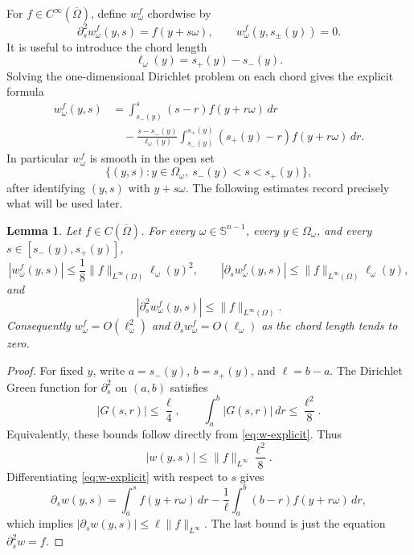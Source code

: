 \documentclass[11pt]{article}
\numberwithin{equation}{section}
\newtheorem{lemma}[theorem]{Lemma}
\newcommand{\Sn}{\mathbb S^{n-1}}
\newcommand{\Om}{\Omega}
\begin{document}
For \(f\in C^\infty(\overline\Om)\), define \(w_\omega^f\) chordwise by
\begin{equation}\label{eq:w-correction}
    \partial_s^2 w_\omega^f(y,s)
    =
    f(y+s\omega),
    \qquad
    w_\omega^f(y,s_\pm(y))=0 .
\end{equation}
It is useful to introduce the chord length
\begin{equation}\label{eq:chord-length}
    \ell_\omega(y)=s_+(y)-s_-(y).
\end{equation}
Solving the one-dimensional Dirichlet problem on each chord gives the explicit formula
\begin{equation}\label{eq:w-explicit}
\begin{aligned}
    w_\omega^f(y,s)
    &=
    \int_{s_-(y)}^s (s-r) f(y+r\omega)\,dr \\
    &\quad
    -
    \frac{s-s_-(y)}{\ell_\omega(y)}
    \int_{s_-(y)}^{s_+(y)}
        (s_+(y)-r) f(y+r\omega)\,dr .
\end{aligned}
\end{equation}
In particular \(w_\omega^f\) is smooth in the open set
\[
    \{(y,s):y\in\Omega_\omega,\ s_-(y)<s<s_+(y)\},
\]
after identifying \((y,s)\) with \(y+s\omega\).  The following estimates record precisely what will be used later.

\begin{lemma}\label{lem:chordwise-C0-bounds}
Let \(f\in C(\overline\Om)\).  For every \(\omega\in\Sn\), every \(y\in\Omega_\omega\), and every \(s\in[s_-(y),s_+(y)]\),
\begin{equation}\label{eq:chordwise-basic-bounds}
    |w_\omega^f(y,s)|
    \le
    \frac18 \|f\|_{L^\infty(\Om)}\ell_\omega(y)^2,
    \qquad
    |\partial_s w_\omega^f(y,s)|
    \le
    \|f\|_{L^\infty(\Om)}\ell_\omega(y),
\end{equation}
and
\begin{equation}\label{eq:chordwise-second-s-bound}
    |\partial_s^2w_\omega^f(y,s)|
    \le
    \|f\|_{L^\infty(\Om)}.
\end{equation}
Consequently \(w_\omega^f=O(\ell_\omega^2)\) and \(\partial_s w_\omega^f=O(\ell_\omega)\) as the chord length tends to zero.
\end{lemma}

\begin{proof}
For fixed \(y\), write \(a=s_-(y)\), \(b=s_+(y)\), and \(\ell=b-a\).  The Dirichlet Green function for \(\partial_s^2\) on \((a,b)\) satisfies
\[
    |G(s,r)|\le \frac{\ell}{4},
    \qquad
    \int_a^b |G(s,r)|\,dr\le \frac{\ell^2}{8}.
\]
Equivalently, these bounds follow directly from \eqref{eq:w-explicit}.  Thus
\[
    |w(y,s)|\le \|f\|_{L^\infty}\frac{\ell^2}{8}.
\]
Differentiating \eqref{eq:w-explicit} with respect to \(s\) gives
\[
    \partial_s w(y,s)
    =
    \int_a^s f(y+r\omega)\,dr
    -
    \frac1\ell
    \int_a^b (b-r)f(y+r\omega)\,dr,
\]
which implies \(|\partial_s w(y,s)|\le \ell\|f\|_{L^\infty}\).  The last bound is just the equation \(\partial_s^2w=f\).
\end{proof}
\end{document}
